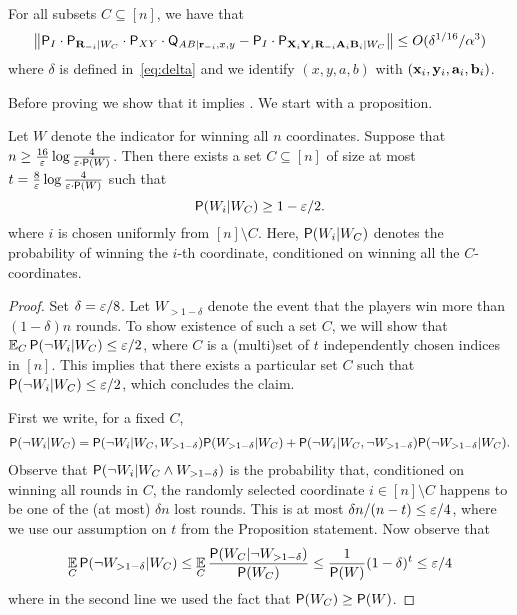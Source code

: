\begin{lemma}
\label{lem:anchorpr_main_lemma}
For all subsets $C \subseteq [n]$, we have that 
\[
	\big \| \P_I \cdot \P_{\bR_\mi | W_C} \cdot \P_{XY} \cdot \Qsf_{AB | \br_\mi, x,y} - \P_I \cdot \P_{\bX_i \bY_i \bR_\mi \bA_i \bB_i | W_C} \big \| \leq O(\delta^{1/16}/\alpha^3)
\]
where $\delta$ is defined in~\eqref{eq:delta} and we identify $(x,y,a,b)$ with $(\bx_i,\by_i,\ba_i,\bb_i)$. 
\end{lemma}

Before proving  we show that it implies . We start with a proposition.

\begin{proposition}
\label{prop:subset}
	Let $W$ denote the indicator for winning all $n$ coordinates. Suppose that $n \geq \frac{16}{\eps} \log \frac{4}{\eps \cdot \P(W)}$. Then there exists a set $C \subseteq [n]$ of size at most $t = \frac{8}{\eps} \log \frac{4}{\eps \cdot \P(W)}$ such that
	$$
		\P (W_i | W_C) \geq 1 - \eps/2.
	$$
	where $i$ is chosen uniformly from $[n] \setminus C$. Here, $\P(W_i | W_C)$ denotes the probability of winning the $i$-th coordinate, conditioned on winning all the $C$-coordinates.
\end{proposition}

\begin{proof}
	Set $\delta = \eps/8$. Let $W_{> 1 - \delta}$ denote the event that the players win more than $(1 - \delta)n$ rounds. To show existence of such a set $C$, we will show that $\Ex_C \P(\neg W_i | W_C) \leq \eps/2$, where $C$ is a (multi)set of $t$ independently chosen indices in $[n]$. This implies that there exists a particular set $C$ such that $\P(\neg W_i | W_C) \leq \eps/2$, which concludes the claim.
	
	First we write, for a fixed $C$,
	\begin{align*}
		\P ( \neg W_i | W_C) = \P(\neg W_i | W_C, W_{> 1 - \delta}) \P(W_{> 1 - \delta} | W_C) + \P(\neg W_i | W_C, \neg W_{> 1 - \delta}) \P(\neg W_{> 1 - \delta} | W_C).
	\end{align*}
	Observe that $\P(\neg W_i | W_C \wedge W_{> 1 - \delta})$ is the probability that, conditioned on winning all rounds in $C$, the randomly selected coordinate $i \in [n] \setminus C$ happens to be one of the (at most) $\delta n$ lost rounds. This is at most $\delta n/(n - t) \leq \eps/4$, where we use our assumption on $t$ from the Proposition statement. Now observe that 
	\begin{align*}
		\Ex_C \P(\neg W_{> 1 - \delta} | W_C) \leq \Ex_C \frac{\P(W_C | \neg W_{> 1 - \delta})}{\P(W_C)} \leq \frac{1}{\P(W)} (1 - \delta)^t \leq \eps/4
	\end{align*}
	where in the second line we used the fact that $\P(W_C) \geq \P(W)$.	
\end{proof}


